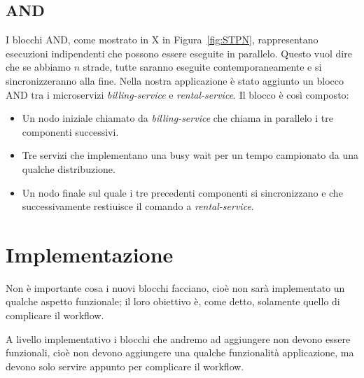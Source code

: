 \subsection{AND}
I blocchi AND, come mostrato in X in Figura~\ref{fig:STPN}, rappresentano esecuzioni indipendenti che possono essere eseguite in parallelo. Questo vuol dire che se abbiamo $n$ strade, tutte saranno eseguite contemporaneamente e si sincronizzeranno alla fine.
Nella nostra applicazione è stato aggiunto un blocco AND tra i microservizi \textit{billing-service} e \textit{rental-service}. Il blocco è così composto:
\begin{itemize}
    \item Un nodo iniziale chiamato da \textit{billing-service} che chiama in parallelo i tre componenti successivi.
    \item Tre servizi che implementano una busy wait per un tempo campionato da una qualche distribuzione.
    \item Un nodo finale sul quale i tre precedenti componenti si sincronizzano e che successivamente restiuisce il comando a \textit{rental-service}.
\end{itemize}

\section{Implementazione}
Non è importante cosa i nuovi blocchi facciano, cioè non sarà implementato un qualche aspetto funzionale; il loro obiettivo è, come detto, solamente quello di complicare il workflow.

A livello implementativo i blocchi che andremo ad aggiungere non devono essere funzionali, cioè non devono aggiungere una qualche funzionalità applicazione, ma devono solo servire appunto per complicare il workflow.